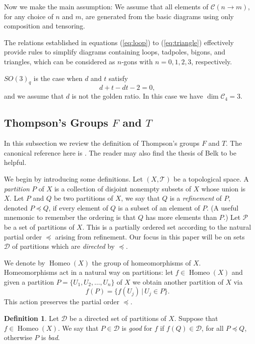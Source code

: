 \documentclass[11pt,oneside]{amsart}
\DeclareMathOperator{\homeo}{Homeo}
\theoremstyle{plain}%
\theoremstyle{definition}
\newtheorem{definition}{Definition}[section]
\theoremstyle{remark}
\begin{document}
Now we make the main assumption: We assume that all elements of $\mathcal{C}(n\to m)$, for any choice of $n$ and $m$, are generated from the basic diagrams using only composition and tensoring.

The relations established in equations (\ref{eq:loop}) to (\ref{eq:triangle}) effectively provide rules to simplify diagrams containing loops, tadpoles, bigons, and triangles, which can be considered as $n$-gons with $n=0, 1, 2, 3$, respectively.

$\mathit{SO}(3)_q$ is the case when $d$ and $t$ satisfy
\begin{equation}
	d+t-d t-2=0,
\end{equation}
and we assume that $d$ is not the golden ratio. In this case we have $\dim\mathcal{C}_4=3$.

\subsection{\texorpdfstring{Thompson's Groups $F$ and $T$}{Thompson's Groups F and T}}
In this subsection we review the definition of Thompson's groups $F$ and $T$. The canonical reference here is \cite{cannon_introductory_1996}. The reader may also find the thesis \cite{belk_thompsons_2007} of Belk to be helpful.

We begin by introducing some definitions. Let $(X,\mathcal{T})$ be a topological space. A \emph{partition} $P$ of $X$ is a collection of disjoint nonempty subsets of $X$ whose union is $X$. Let $P$ and $Q$ be two partitions of $X$, we say that $Q$ is a \emph{refinement} of $P$, denoted $P\preceq Q$, if every element of $Q$ is a subset of an element of $P$. (A useful mnemonic to remember the ordering is that $Q$ has more elements than $P$.) Let $\mathcal{P}$ be a set of partitions of $X$. This is a partially ordered set according to the natural partial order $\preceq$ arising from refinement. Our focus in this paper will be on sets $\mathcal{D}$ of partitions which are \emph{directed} by $\preceq$.

We denote by $\homeo(X)$ the group of homeomorphisms of $X$. Homeomorphisms act in a natural way on partitions: let $f\in\homeo(X)$ and given a partition $P = \{U_1, U_2, \ldots, U_n\}$ of $X$ we obtain another partition of $X$ via
\begin{equation}
	f(P) = \{f(U_j)\,|\, U_j\in P \}.
\end{equation}
This action preserves the partial order $\preceq$.

\begin{definition}
Let $\mathcal{D}$ be a directed set of partitions of $X$. Suppose that $f\in \homeo(X)$. We say that $P\in\mathcal{D}$ is \emph{good} for $f$ if $f(Q) \in \mathcal{D}$, for all $P \preceq Q$, otherwise $P$ is \emph{bad}.
\end{definition}
\end{document}
